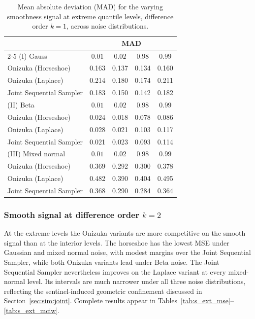\begin{table}[htbp]
\centering
\caption{Mean absolute deviation (MAD) for the varying smoothness signal at extreme quantile levels, difference order $k = 1$, across noise distributions.}
\label{tab:vs_ext_mad}
\begin{tabular}{lcccc}
\toprule
& \multicolumn{4}{c}{MAD} \\
\cmidrule(lr){2-5}
(I) Gauss & $0.01$ & $0.02$ & $0.98$ & $0.99$ \\
\midrule
Onizuka (Horseshoe)      & 0.163 & 0.137 & 0.134 & 0.160 \\
Onizuka (Laplace)        & 0.214 & 0.180 & 0.174 & 0.211 \\
Joint Sequential Sampler & 0.183 & 0.150 & 0.142 & 0.182 \\
\midrule
(II) Beta & $0.01$ & $0.02$ & $0.98$ & $0.99$ \\
\midrule
Onizuka (Horseshoe)      & 0.024 & 0.018 & 0.078 & 0.086 \\
Onizuka (Laplace)        & 0.028 & 0.021 & 0.103 & 0.117 \\
Joint Sequential Sampler & 0.021 & 0.023 & 0.093 & 0.114 \\
\midrule
(III) Mixed normal & $0.01$ & $0.02$ & $0.98$ & $0.99$ \\
\midrule
Onizuka (Horseshoe)      & 0.369 & 0.292 & 0.300 & 0.378 \\
Onizuka (Laplace)        & 0.482 & 0.390 & 0.404 & 0.495 \\
Joint Sequential Sampler & 0.368 & 0.290 & 0.284 & 0.364 \\
\bottomrule
\end{tabular}
\end{table}

\subsubsection{Smooth signal at difference order \texorpdfstring{$k=2$}{k=2}}
\label{app:sim:joint:smooth}

At the extreme levels the Onizuka variants are more competitive on the smooth signal than at the interior levels. The horseshoe has the lowest MSE under Gaussian and mixed normal noise, with modest margins over the Joint Sequential Sampler, while both Onizuka variants lead under Beta noise. The Joint Sequential Sampler nevertheless improves on the Laplace variant at every mixed-normal level. Its intervals are much narrower under all three noise distributions, reflecting the sentinel-induced geometric confinement discussed in Section~\ref{sec:sim:joint}. Complete results appear in Tables~\ref{tab:s_ext_mse}--\ref{tab:s_ext_mciw}.

